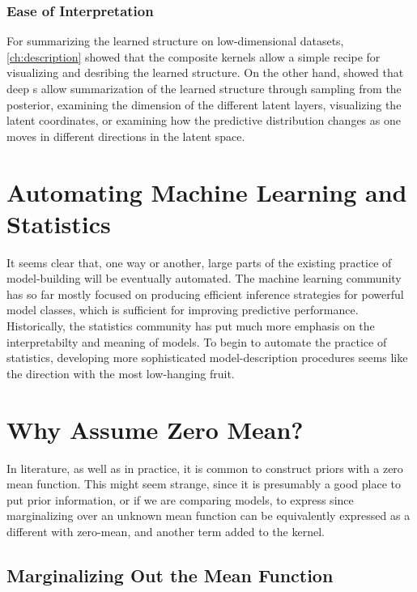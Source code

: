 \subsubsection{Ease of Interpretation}
For summarizing the learned structure on low-dimensional datasets, \cref{ch:description} showed that the composite kernels allow a simple recipe for visualizing and desribing the learned structure.
On the other hand, \citet{damianou2012deep} showed that deep \gplvm{}s allow summarization of the learned structure through sampling from the posterior, examining the dimension of the different latent layers, visualizing the latent coordinates, or examining how the predictive distribution changes as one moves in different directions in the latent space.

\section{Automating Machine Learning and Statistics}

It seems clear that, one way or another, large parts of the existing practice of model-building will be eventually automated.
The machine learning community has so far mostly focused on producing efficient inference strategies for powerful model classes, which is sufficient for improving predictive performance.
Historically, the statistics community has put much more emphasis on the interpretabilty and meaning of models.
To begin to automate the practice of statistics, developing more sophisticated model-description procedures seems like the direction with the most low-hanging fruit.




\iffalse
\section{Why Assume Zero Mean?}

In literature, as well as in practice, it is common to construct \gp{} priors with a zero mean function.
This might seem strange, since it is presumably a good place to put prior information, or if we are comparing models, to express  since marginalizing over an unknown mean function can be equivalently expressed as a different \gp{} with zero-mean, and another term added to the kernel.


\subsection{Marginalizing Out the Mean Function}

